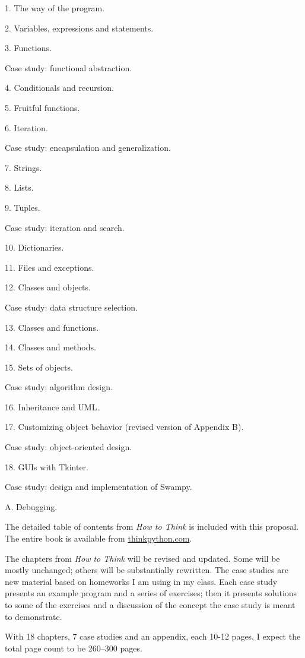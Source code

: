 \documentclass{article}
\begin{document}
1.  The way of the program.

2.  Variables, expressions and statements.

3.  Functions.

\quad \quad    Case study: functional abstraction.

4.  Conditionals and recursion.

5.  Fruitful functions.

6.  Iteration.

\quad \quad    Case study: encapsulation and generalization.

7.  Strings.

8.  Lists.

9.  Tuples.

\quad \quad    Case study: iteration and search.

10. Dictionaries.

11. Files and exceptions.

12. Classes and objects.

\quad \quad    Case study: data structure selection.

13. Classes and functions.

14. Classes and methods.

15. Sets of objects.

\quad \quad    Case study: algorithm design.

16. Inheritance and UML.

17. Customizing object behavior (revised version of Appendix B).

\quad \quad    Case study: object-oriented design.

18. GUIs with Tkinter.

\quad \quad    Case study: design and implementation of Swampy.

A.  Debugging.

The detailed table of contents from {\em How to Think} is included with
this proposal.  The entire book is available from \url{thinkpython.com}.

The chapters from {\em How to Think} will be revised and updated.  Some
will be mostly unchanged; others will be substantially rewritten.
The case studies are new material based on homeworks I am using in my
class.  Each case study presents an example program and a series of
exercises; then it presents solutions to some of the exercises and a
discussion of the concept the case study is meant to demonstrate.

With 18 chapters, 7 case studies and an appendix, each 10-12 pages,
I expect the total page count to be 260--300 pages.
\end{document}
